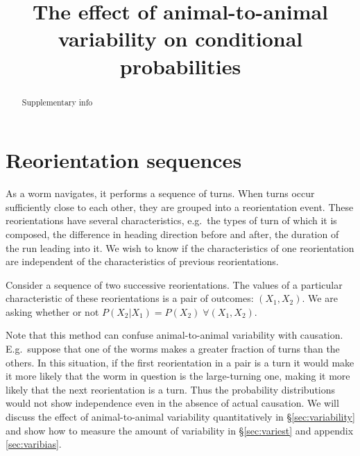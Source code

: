 \documentclass[12pt]{article}
\title{The effect of animal-to-animal variability on conditional probabilities}
\newcommand{\sref}[1]{\S\ref{#1}}
\newcommand{\eg}{e.g.\ }
\newcommand{\Eg}{E.g.\ }
\begin{document}
\maketitle




\begin{abstract}
  Supplementary info
\end{abstract}



\section{Reorientation sequences}\label{sec:reoseq}

As a worm navigates, it performs a sequence of turns. When turns occur sufficiently close to each other, they are grouped into a reorientation event. These reorientations have several characteristics, \eg the types of turn of which it is composed, the difference in heading direction before and after, the duration of the run leading into it. We wish to know if the characteristics of one reorientation are independent of the characteristics of previous reorientations.

Consider a sequence of two successive reorientations. The values of a particular characteristic of these reorientations is a pair of outcomes: $(X_1,X_2)$. We are asking whether or not $P(X_2|X_1) = P(X_2) \; \forall (X_1,X_2)$.

%

Note that this method can confuse animal-to-animal variability with causation. \Eg suppose that one of the worms makes a greater fraction of turns than the others. In this situation, if the first reorientation in a pair is a turn it would make it more likely that the worm in question is the large-turning one, making it more likely that the next reorientation is a turn. Thus the probability distributions would not show independence even in the absence of actual causation. We will discuss the effect of animal-to-animal variability quantitatively in \sref{sec:variability} and show how to measure the amount of variability in \sref{sec:variest} and appendix \ref{sec:varibias}.
\end{document}
